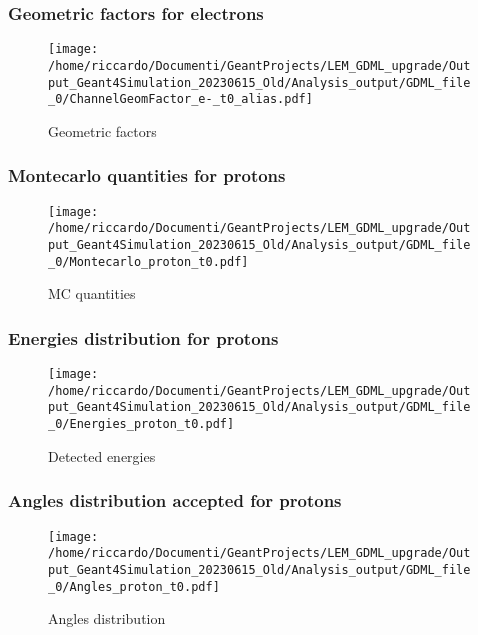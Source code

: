 \documentclass[8pt]{beamer}
\begin{document}
        \begin{frame}
            \frametitle{Geometric factors for electrons}
        
        \begin{figure}[h]
            \centering
            \texttt{[image: /home/riccardo/Documenti/GeantProjects/LEM\_GDML\_upgrade/Output\_Geant4Simulation\_20230615\_Old/Analysis\_output/GDML\_file\_0/ChannelGeomFactor\_e-\_t0\_alias.pdf]}
            \caption{Geometric factors}
        \end{figure}
        
        \end{frame}
        
        \begin{frame}
            \frametitle{Montecarlo quantities for protons}
        
        \begin{figure}[h]
            \centering
            \texttt{[image: /home/riccardo/Documenti/GeantProjects/LEM\_GDML\_upgrade/Output\_Geant4Simulation\_20230615\_Old/Analysis\_output/GDML\_file\_0/Montecarlo\_proton\_t0.pdf]}
            \caption{MC quantities}
        \end{figure}
        
        \end{frame}
        
        \begin{frame}
            \frametitle{Energies distribution for protons}
        
        \begin{figure}[h]
            \centering
            \texttt{[image: /home/riccardo/Documenti/GeantProjects/LEM\_GDML\_upgrade/Output\_Geant4Simulation\_20230615\_Old/Analysis\_output/GDML\_file\_0/Energies\_proton\_t0.pdf]}
            \caption{Detected energies}
        \end{figure}
        
        \end{frame}
        
        \begin{frame}
            \frametitle{Angles distribution accepted for protons}
        
        \begin{figure}[h]
            \centering
            \texttt{[image: /home/riccardo/Documenti/GeantProjects/LEM\_GDML\_upgrade/Output\_Geant4Simulation\_20230615\_Old/Analysis\_output/GDML\_file\_0/Angles\_proton\_t0.pdf]}
            \caption{Angles distribution}
        \end{figure}
        
        \end{frame}
        
\end{document}
